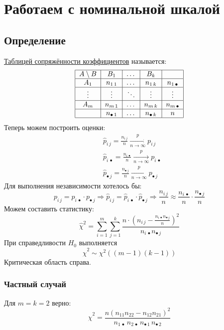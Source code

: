 \documentclass[12pt, a4paper]{article}
\begin{document}
\section*{Работаем с номинальной шкалой}
\subsection*{Определение}
\underline{Таблицей сопряжённости коэффициентов} называется:
\[\begin{tabular}{|c|c|c|c|c|}
    \hline
    $A\setminus B$ & $B_1$ & $\dots$ & $B_k$ &  \\
    \hline
    $A_1$ & $n_{1\, 1}$ & $\dots$ & $n_{1\, k}$ & $n_{1\, \bullet}$\\
    \hline
    $\vdots$ & $\vdots$ & $\ddots$ & $\vdots$ & $\vdots$\\
    \hline
    $A_{m} $ & $n_{m\, 1}$ & $\dots$ & $n_{m\, k}$ & $n_{m\, \bullet}$\\
    \hline
     & $n_{\bullet\, 1}$ & $\dots$ & $n_{\bullet\, k}$ & $n$\\
     \hline
\end{tabular}\]
Теперь можем построить оценки:
\begin{equation*}
    \begin{aligned}
        &\hat p_{i\, j} = \frac{n_{i\, j}}{n} \xrightarrow[n \to \infty]{p} p_{i\, j}\\
        &\hat p_{i\, \bullet} = \frac{n_{i\, \bullet}}{n} \xrightarrow[n\to \infty]{p} p_{i\, \bullet}\\
        &\hat p_{\bullet\, j} = \frac{n_{\bullet\, j}}{n} \xrightarrow[n\to\infty]{p} p_{\bullet\, j}
    \end{aligned}
\end{equation*}
Для выполнения независимости хотелось бы:
\[p_{i\, j} = p_{i\, \bullet} \cdot p_{\bullet\, j} \Rightarrow \hat p_{i\, j} = \hat p_{i\, \bullet} \cdot \hat p_{\bullet\, j} \Rightarrow \frac{n_{i\, j}}{n} \approx \frac{n_{i\, \bullet}}{n} \cdot \frac{n_{\bullet\, j}}{n}\]
Можем составить статистику:
\[\hat \chi^2 = \sum_{i = 1}^{m} \sum_{j = 1}^{k} \frac{n \cdot {\left(n_{i\, j} - \frac{n_{i\, \bullet} n_{\bullet\, j}}{n}\right)}^2}{n_{i\, \bullet} n_{\bullet\, j}}\]
При справедливости $H_0$ выполняется
\[\hat \chi^2 \sim \chi^2\left( (m - 1)(k - 1) \right)\]
Критическая область справа.
\subsubsection*{Частный случай}
Для $m = k = 2$ верно:
\[\hat \chi^2 = \frac{n {(n_{11} n_{22} - n_{12} n_{21})}^2}{ n_{1\, \bullet}\, n_{2\, \bullet}\, n_{\bullet\, 1}\, n _{\bullet\, 2} }\]
\end{document}

